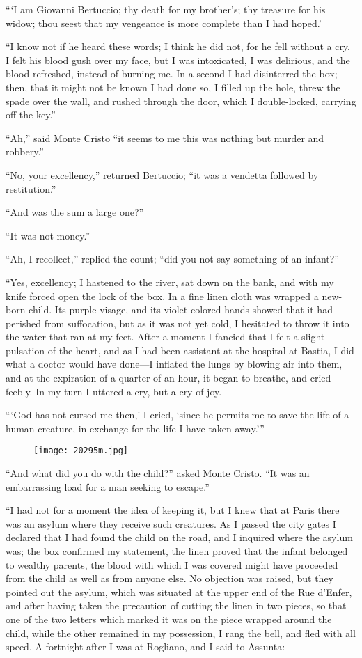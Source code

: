 “‘I am Giovanni Bertuccio; thy death for my brother’s; thy treasure for
his widow; thou seest that my vengeance is more complete than I had
hoped.’

“I know not if he heard these words; I think he did not, for he fell
without a cry. I felt his blood gush over my face, but I was
intoxicated, I was delirious, and the blood refreshed, instead of
burning me. In a second I had disinterred the box; then, that it might
not be known I had done so, I filled up the hole, threw the spade over
the wall, and rushed through the door, which I double-locked, carrying
off the key.”

“Ah,” said Monte Cristo “it seems to me this was nothing but murder and
robbery.”

“No, your excellency,” returned Bertuccio; “it was a vendetta followed
by restitution.”

“And was the sum a large one?”

“It was not money.”

“Ah, I recollect,” replied the count; “did you not say something of an
infant?”

“Yes, excellency; I hastened to the river, sat down on the bank, and
with my knife forced open the lock of the box. In a fine linen cloth
was wrapped a new-born child. Its purple visage, and its violet-colored
hands showed that it had perished from suffocation, but as it was not
yet cold, I hesitated to throw it into the water that ran at my feet.
After a moment I fancied that I felt a slight pulsation of the heart,
and as I had been assistant at the hospital at Bastia, I did what a
doctor would have done—I inflated the lungs by blowing air into them,
and at the expiration of a quarter of an hour, it began to breathe, and
cried feebly. In my turn I uttered a cry, but a cry of joy.

“‘God has not cursed me then,’ I cried, ‘since he permits me to save
the life of a human creature, in exchange for the life I have taken
away.’”

\begin{figure}[ht]
\texttt{[image: 20295m.jpg]}
\end{figure}

“And what did you do with the child?” asked Monte Cristo. “It was an
embarrassing load for a man seeking to escape.”

“I had not for a moment the idea of keeping it, but I knew that at
Paris there was an asylum where they receive such creatures. As I
passed the city gates I declared that I had found the child on the
road, and I inquired where the asylum was; the box confirmed my
statement, the linen proved that the infant belonged to wealthy
parents, the blood with which I was covered might have proceeded from
the child as well as from anyone else. No objection was raised, but
they pointed out the asylum, which was situated at the upper end of the
Rue d’Enfer, and after having taken the precaution of cutting the linen
in two pieces, so that one of the two letters which marked it was on
the piece wrapped around the child, while the other remained in my
possession, I rang the bell, and fled with all speed. A fortnight after
I was at Rogliano, and I said to Assunta:

